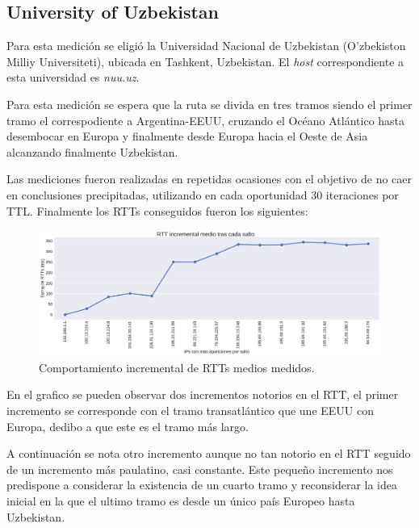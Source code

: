\subsection{University of Uzbekistan}

Para esta medición se eligió la Universidad Nacional de Uzbekistan (O'zbekiston Milliy Universiteti), ubicada en Tashkent, Uzbekistan. El \emph{host} correspondiente a esta universidad es \emph{nuu.uz}.\par 
Para esta medici\'on se espera que la ruta se divida en tres tramos siendo el primer tramo el correspodiente a Argentina-EEUU, cruzando el Océano Atlántico hasta desembocar en Europa y finalmente desde Europa hacia el Oeste de Asia alcanzando finalmente Uzbekistan.\par
Las mediciones fueron realizadas en repetidas ocasiones con el objetivo de no caer en conclusiones precipitadas, utilizando en cada oportunidad 30 iteraciones por TTL. Finalmente los RTTs conseguidos fueron los siguientes: \\
\begin{figure}[H]
    \centering
    \includegraphics[width=1\textwidth, height=1\textheight, keepaspectratio]{../img/nuu-uz-incrementales}
    \caption{Comportamiento incremental de RTTs medios medidos.}
    \label{fig:nuu-uz-incrementales}
\end{figure}
En el grafico se pueden observar dos incrementos notorios en el RTT, el primer incremento se corresponde con el tramo transatlántico que une EEUU con Europa, dedibo a que este es el tramo más largo.\par
A continuación se nota otro incremento aunque no tan notorio en el RTT seguido de un incremento más paulatino, casi constante. Este pequeño incremento nos predispone a considerar la existencia de un cuarto tramo y reconsiderar la idea inicial en la que el ultimo tramo es desde un único país Europeo hasta Uzbekistan.\par 



